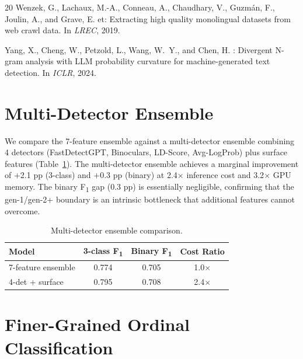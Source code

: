 \documentclass[11pt,a4paper]{article}
\newcommand{\fone}{F\textsubscript{1}}
\begin{document}
\begin{thebibliography}{20}
Wenzek, G., Lachaux, M.-A., Conneau, A., Chaudhary, V., Guzm{\'a}n, F., Joulin, A., and Grave, E.
et: Extracting high quality monolingual datasets from web crawl data.
\newblock In \emph{LREC}, 2019.

Yang, X., Cheng, W., Petzold, L., Wang, W.~Y., and Chen, H.
: Divergent {N}-gram analysis with {LLM} probability curvature for machine-generated text detection.
\newblock In \emph{ICLR}, 2024.

\end{thebibliography}

\clearpage
\appendix

\section{Multi-Detector Ensemble}
\label{app:ensemble}

We compare the 7-feature ensemble against a multi-detector ensemble combining 4 detectors (FastDetectGPT, Binoculars, LD-Score, Avg-LogProb) plus surface features (Table~\ref{tab:ensemble}).
The multi-detector ensemble achieves a marginal improvement of $+$2.1 pp (3-class) and $+$0.3 pp (binary) at 2.4$\times$ inference cost and 3.2$\times$ GPU memory.
The binary \fone{} gap (0.3 pp) is essentially negligible, confirming that the gen-1/gen-2+ boundary is an intrinsic bottleneck that additional features cannot overcome.

\begin{table}[h]
\centering
\caption{Multi-detector ensemble comparison.}
\label{tab:ensemble}
\begin{tabular}{lccc}
\toprule
\textbf{Model} & \textbf{3-class \fone{}} & \textbf{Binary \fone{}} & \textbf{Cost Ratio} \\
\midrule
7-feature ensemble & 0.774 & 0.705 & 1.0$\times$ \\
4-det + surface & 0.795 & 0.708 & 2.4$\times$ \\
\bottomrule
\end{tabular}
\end{table}

\section{Finer-Grained Ordinal Classification}
\label{app:ordinal}
\end{document}
